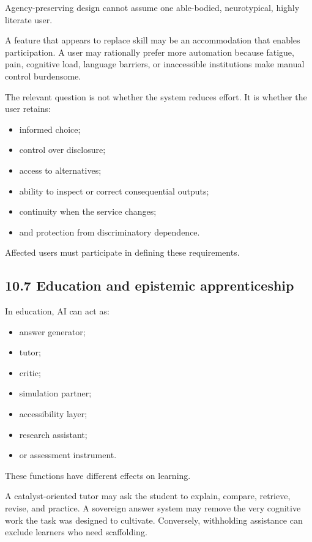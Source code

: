 \documentclass[
  11pt,
]{article}
\providecommand{\tightlist}{%
  \setlength{\itemsep}{0pt}\setlength{\parskip}{0pt}}
\begin{document}
Agency-preserving design cannot assume one able-bodied, neurotypical,
highly literate user.

A feature that appears to replace skill may be an accommodation that
enables participation. A user may rationally prefer more automation
because fatigue, pain, cognitive load, language barriers, or
inaccessible institutions make manual control burdensome.

The relevant question is not whether the system reduces effort. It is
whether the user retains:

\begin{itemize}
\tightlist
\item
  informed choice;
\item
  control over disclosure;
\item
  access to alternatives;
\item
  ability to inspect or correct consequential outputs;
\item
  continuity when the service changes;
\item
  and protection from discriminatory dependence.
\end{itemize}

Affected users must participate in defining these requirements.

\subsection{10.7 Education and epistemic
apprenticeship}\label{education-and-epistemic-apprenticeship}

In education, AI can act as:

\begin{itemize}
\tightlist
\item
  answer generator;
\item
  tutor;
\item
  critic;
\item
  simulation partner;
\item
  accessibility layer;
\item
  research assistant;
\item
  or assessment instrument.
\end{itemize}

These functions have different effects on learning.

A catalyst-oriented tutor may ask the student to explain, compare,
retrieve, revise, and practice. A sovereign answer system may remove the
very cognitive work the task was designed to cultivate. Conversely,
withholding assistance can exclude learners who need scaffolding.
\end{document}

